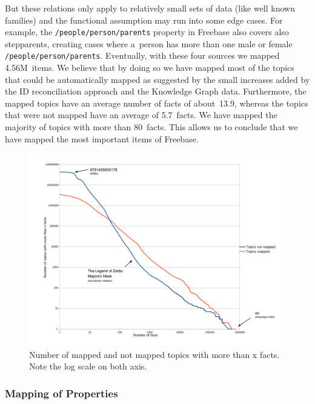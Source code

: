 \documentclass{sig-alternate}
\begin{document}
But these relations only apply to relatively small sets of data (like well known families)
and the functional assumption may run into some edge cases.
For example, the \texttt{/people/person/parents} property in Freebase also covers also stepparents,
creating cases where a~person has more than one male or female \texttt{/people/person/parents}.
Eventually, with these four sources we mapped 4.56M~items.
We believe that by doing so we have mapped most of the topics that could be automatically mapped
as suggested by the small increases added by the ID reconciliation approach
and the Knowledge Graph data.
Furthermore, the mapped topics have an average number of facts of about~13.9,
whereas the topics that were not mapped have an average of 5.7~facts.
We have mapped the majority of topics with more than 80~facts.
This allows us to conclude that we have mapped the most important items of Freebase.

\begin{figure}[!htbp]
\centering
\includegraphics[width=8.45 cm]{img/facts-topics-mapping.png}
\caption{Number of mapped and not mapped topics with more than x facts.
Note the log scale on both axis.}
\end{figure}

\subsubsection{Mapping of Properties}
\end{document}
